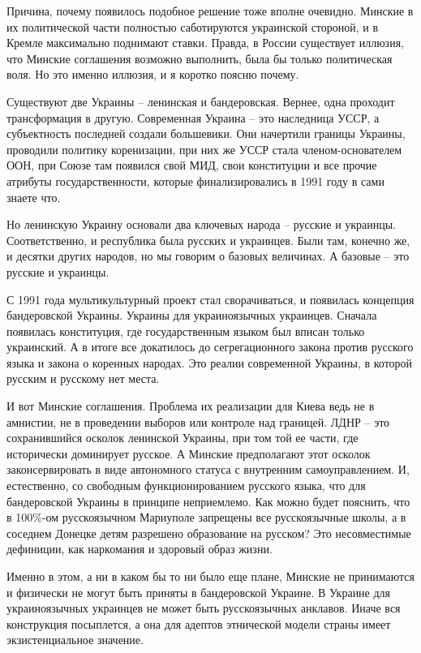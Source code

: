 Причина, почему появилось подобное решение тоже вполне очевидно. Минские в их
политической части полностью саботируются украинской стороной, и в Кремле
максимально поднимают ставки. Правда, в России существует иллюзия, что Минские
соглашения возможно выполнить, была бы только политическая воля. Но это именно
иллюзия, и я коротко поясню почему.

Существуют две Украины – ленинская и бандеровская. Вернее, одна проходит
трансформация в другую. Современная Украина – это наследница УССР, а
субъектность последней создали большевики. Они начертили границы Украины,
проводили политику коренизации, при них же УССР стала членом-основателем ООН,
при Союзе там появился свой МИД, свои конституции и все прочие атрибуты
государственности, которые финализировались в 1991 году в сами знаете что.

Но ленинскую Украину основали два ключевых народа – русские и украинцы.
Соответственно, и республика была русских и украинцев. Были там, конечно же, и
десятки других народов, но мы говорим о базовых величинах. А базовые – это
русские и украинцы.

С 1991 года мультикультурный проект стал сворачиваться, и появилась концепция
бандеровской Украины. Украины для украиноязычных украинцев. Сначала появилась
конституция, где государственным языком был вписан только украинский. А в итоге
все докатилось до сегрегационного закона против русского языка и закона о
коренных народах. Это реалии современной Украины, в которой русским и русскому
нет места.

И вот Минские соглашения. Проблема их реализации для Киева ведь не в амнистии,
не в проведении выборов или контроле над границей. ЛДНР – это сохранившийся
осколок ленинской Украины, при том той ее части, где исторически доминирует
русское. А Минские предполагают этот осколок законсервировать в виде
автономного статуса с внутренним самоуправлением. И, естественно, со свободным
функционированием русского языка, что для бандеровской Украины в принципе
неприемлемо. Как можно будет пояснить, что в 100\%-ом русскоязычном Мариуполе
запрещены все русскоязычные школы, а в соседнем Донецке детям разрешено
образование на русском? Это несовместимые дефиниции, как наркомания и здоровый
образ жизни.

Именно в этом, а ни в каком бы то ни было еще плане, Минские не принимаются и
физически не могут быть приняты в бандеровской Украине. В Украине для
украиноязычных украинцев не может быть русскоязычных анклавов. Иначе вся
конструкция посыплется, а она для адептов этнической модели страны имеет
экзистенциальное значение.

